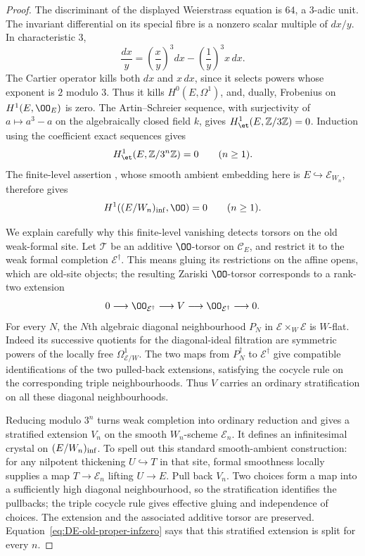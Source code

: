 \begin{proof}
The discriminant of the displayed Weierstrass equation is $64$, a $3$-adic unit.  The invariant differential on its special fibre is a nonzero scalar multiple of $dx/y$.  In characteristic $3$,
\[
 \frac{dx}{y}=\left(\frac{x}{y}\right)^3dx
                  -\left(\frac1y\right)^3x\,dx.
\]
The Cartier operator kills both $dx$ and $x\,dx$, since it selects powers whose exponent is $2$ modulo $3$.  Thus it kills $H^0(E,\Omega^1)$, and, dually, Frobenius on $H^1(E,\OO_E)$ is zero.  The Artin--Schreier sequence, with surjectivity of $a\mapsto a^3-a$ on the algebraically closed field $k$, gives
$H^1_{\et}(E,\mathbb Z/3\mathbb Z)=0$.  Induction using the coefficient exact sequences gives
\[
 H^1_{\et}(E,\mathbb Z/3^n\mathbb Z)=0\qquad(n\geq1).
\]
The finite-level assertion \cite[Corollary~4.7]{Ogus1975}, whose smooth ambient embedding here is $E\hookrightarrow\mathcal E_{W_n}$, therefore gives
\begin{equation}\label{eq:DE-old-proper-infzero}
                  H^1((E/W_n)_{\rm inf},\OO)=0
                  \qquad(n\geq1).
\end{equation}

We explain carefully why this finite-level vanishing detects torsors on the old weak-formal site.  Let $\mathcal T$ be an additive $\OO$-torsor on $\mathcal C_E$, and restrict it to the weak formal completion $\mathcal E^\dagger$.  This means gluing its restrictions on the affine opens, which are old-site objects; the resulting Zariski $\OO$-torsor corresponds to a rank-two extension
\[
     0\longrightarrow\OO_{\mathcal E^\dagger}
       \longrightarrow V\longrightarrow\OO_{\mathcal E^\dagger}
       \longrightarrow0.
\]
For every $N$, the $N$th algebraic diagonal neighbourhood $P_N$ in $\mathcal E\times_W\mathcal E$ is $W$-flat.  Indeed its successive quotients for the diagonal-ideal filtration are symmetric powers of the locally free $\Omega^1_{\mathcal E/W}$.  The two maps from $P_N^\dagger$ to $\mathcal E^\dagger$ give compatible identifications of the two pulled-back extensions, satisfying the cocycle rule on the corresponding triple neighbourhoods.  Thus $V$ carries an ordinary stratification on all these diagonal neighbourhoods.

Reducing modulo $3^n$ turns weak completion into ordinary reduction and gives a stratified extension $V_n$ on the smooth $W_n$-scheme $\mathcal E_n$.  It defines an infinitesimal crystal on $(E/W_n)_{\rm inf}$.  To spell out this standard smooth-ambient construction: for any nilpotent thickening $U\hookrightarrow T$ in that site, formal smoothness locally supplies a map $T\to\mathcal E_n$ lifting $U\to E$.  Pull back $V_n$.  Two choices form a map into a sufficiently high diagonal neighbourhood, so the stratification identifies the pullbacks; the triple cocycle rule gives effective gluing and independence of choices.  The extension and the associated additive torsor are preserved.  Equation~\eqref{eq:DE-old-proper-infzero} says that this stratified extension is split for every $n$.


\end{proof}
